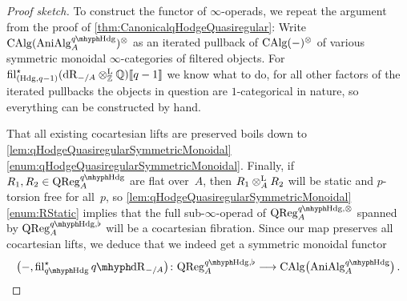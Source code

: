 \documentclass[DIV=12,numbers=enddot,leqno,bibliography=totoc]{scrartcl}
\begin{document}
	\begin{proof}[Proof sketch]
		To construct the functor of $\infty$-operads, we repeat the argument from the proof of \cref{thm:CanonicalqHodgeQuasiregular}: Write $\CAlg(\cat{AniAlg}_A^{\qHodge})^\otimes$ as an iterated pullback of $\operatorname{CAlg}(-)^{\otimes}$ of various symmetric monoidal $\infty$-categories of filtered objects. For $\operatorname{fil}_{(\mathrm{Hdg},q-1)}^\star(\mathrm{dR}_{-/A}\otimes^{\mathrm{L}}_{\mathbb{Z}}\mathbb{Q})\llbracket q-1\rrbracket$ we know what to do, for all other factors of the iterated pullbacks the objects in question are $1$-categorical in nature, so everything can be constructed by hand.
		
		That all existing cocartesian lifts are preserved boils down to \cref{lem:qHodgeQuasiregularSymmetricMonoidal}\cref{enum:qHodgeQuasiregularSymmetricMonoidal}. Finally, if $R_1,R_2\in\cat{QReg}_A^{\qHodge}$ are flat over~$A$, then $R_1\otimes^{\mathrm{L}}_A R_2$ will be static and $p$-torsion free for all~$p$, so \cref{lem:qHodgeQuasiregularSymmetricMonoidal}\cref{enum:RStatic} implies that the full sub-$\infty$-operad of $\cat{QReg}_A^{\qHodge,\otimes}$ spanned by $\cat{QReg}_A^{\qHodge,\flat}$ will be a cocartesian fibration. Since our map preserves all cocartesian lifts, we deduce that we indeed get a symmetric monoidal functor
		\begin{equation*}
			\bigl(-,\fil_{\qHodge}^\star\qdeRham_{-/A}\bigr)\colon \cat{QReg}_A^{\qHodge,\flat}\longrightarrow \CAlg\bigl(\cat{AniAlg}_A^{\qHodge}\bigr)\,.\qedhere
		\end{equation*}
	\end{proof}
	
	
	
	
	

	
	
	
	
	
	
	
	
	
	
	\newpage
	\appendix
	\renewcommand{\thetheorem}{\thesection.\arabic{theorem}}
	\renewcommand{\SectionPrefix}{Appendix~}
	
\end{document}
